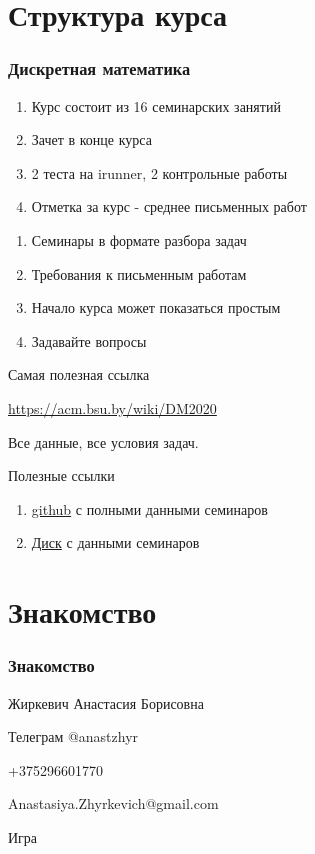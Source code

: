 \documentclass[10pt]{beamer}
\theoremstyle{remark}
\theoremstyle{definition}
\begin{document}
\section{Структура курса}
\begin{frame}[allowframebreaks]
\frametitle{Дискретная математика}

\begin{enumerate}
    \item Курс состоит из 16 семинарских занятий
    \item Зачет в конце курса
    \item 2 теста на irunner, 2 контрольные работы 
    \item Отметка за курс - среднее письменных работ
\end{enumerate}

\framebreak

\begin{enumerate}
    \item Семинары в формате разбора задач
    \item Требования к письменным работам
    \item Начало курса может показаться простым
    \item Задавайте вопросы

\end{enumerate}

\framebreak 

Самая полезная ссылка

\href{https://acm.bsu.by/wiki/DM2020}{https://acm.bsu.by/wiki/DM2020}

Все данные, все условия задач.

Полезные ссылки 
\begin{enumerate}
    \item \href{https://github.com/Anastasiya-Zhyrkevich/DiscreteMath-solutions}{github} с полными данными семинаров
    \item \href{https://drive.google.com/drive/folders/1LO6ifRf9qDqoghwRaMIpPo1crvZeAjjn?usp=sharing}{Диск} с данными семинаров
\end{enumerate}

\framebreak

\end{frame}


\section{Знакомство}
\begin{frame}[allowframebreaks]
\frametitle{Знакомство}

Жиркевич Анастасия Борисовна 

Телеграм @anastzhyr 

+375296601770

Anastasiya.Zhyrkevich@gmail.com

\framebreak 

Игра

\end{frame}
\end{document}
